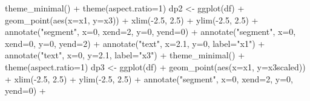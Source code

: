 \documentclass[
  letterpaper,
]{book}
\newenvironment{Shaded}{\begin{snugshade}}{\end{snugshade}}
\newcommand{\AttributeTok}[1]{\textcolor[rgb]{0.40,0.45,0.13}{#1}}
\newcommand{\DecValTok}[1]{\textcolor[rgb]{0.68,0.00,0.00}{#1}}
\newcommand{\FloatTok}[1]{\textcolor[rgb]{0.68,0.00,0.00}{#1}}
\newcommand{\FunctionTok}[1]{\textcolor[rgb]{0.28,0.35,0.67}{#1}}
\newcommand{\NormalTok}[1]{\textcolor[rgb]{0.00,0.23,0.31}{#1}}
\newcommand{\OtherTok}[1]{\textcolor[rgb]{0.00,0.23,0.31}{#1}}
\newcommand{\SpecialCharTok}[1]{\textcolor[rgb]{0.37,0.37,0.37}{#1}}
\newcommand{\StringTok}[1]{\textcolor[rgb]{0.13,0.47,0.30}{#1}}
\begin{document}
\begin{Shaded}
\begin{Highlighting}[]
  \FunctionTok{theme\_minimal}\NormalTok{() }\SpecialCharTok{+}
  \FunctionTok{theme}\NormalTok{(}\AttributeTok{aspect.ratio=}\DecValTok{1}\NormalTok{)}
\NormalTok{dp2 }\OtherTok{\textless{}{-}} \FunctionTok{ggplot}\NormalTok{(df) }\SpecialCharTok{+} 
  \FunctionTok{geom\_point}\NormalTok{(}\FunctionTok{aes}\NormalTok{(}\AttributeTok{x=}\NormalTok{x1, }\AttributeTok{y=}\NormalTok{x3)) }\SpecialCharTok{+}
  \FunctionTok{xlim}\NormalTok{(}\SpecialCharTok{{-}}\FloatTok{2.5}\NormalTok{, }\FloatTok{2.5}\NormalTok{) }\SpecialCharTok{+} \FunctionTok{ylim}\NormalTok{(}\SpecialCharTok{{-}}\FloatTok{2.5}\NormalTok{, }\FloatTok{2.5}\NormalTok{) }\SpecialCharTok{+}
  \FunctionTok{annotate}\NormalTok{(}\StringTok{"segment"}\NormalTok{, }\AttributeTok{x=}\DecValTok{0}\NormalTok{, }\AttributeTok{xend=}\DecValTok{2}\NormalTok{, }\AttributeTok{y=}\DecValTok{0}\NormalTok{, }\AttributeTok{yend=}\DecValTok{0}\NormalTok{) }\SpecialCharTok{+}
  \FunctionTok{annotate}\NormalTok{(}\StringTok{"segment"}\NormalTok{, }\AttributeTok{x=}\DecValTok{0}\NormalTok{, }\AttributeTok{xend=}\DecValTok{0}\NormalTok{, }\AttributeTok{y=}\DecValTok{0}\NormalTok{, }\AttributeTok{yend=}\DecValTok{2}\NormalTok{) }\SpecialCharTok{+}
  \FunctionTok{annotate}\NormalTok{(}\StringTok{"text"}\NormalTok{, }\AttributeTok{x=}\FloatTok{2.1}\NormalTok{, }\AttributeTok{y=}\DecValTok{0}\NormalTok{, }\AttributeTok{label=}\StringTok{"x1"}\NormalTok{) }\SpecialCharTok{+}
  \FunctionTok{annotate}\NormalTok{(}\StringTok{"text"}\NormalTok{, }\AttributeTok{x=}\DecValTok{0}\NormalTok{, }\AttributeTok{y=}\FloatTok{2.1}\NormalTok{, }\AttributeTok{label=}\StringTok{"x3"}\NormalTok{) }\SpecialCharTok{+}
  \FunctionTok{theme\_minimal}\NormalTok{() }\SpecialCharTok{+}
  \FunctionTok{theme}\NormalTok{(}\AttributeTok{aspect.ratio=}\DecValTok{1}\NormalTok{)}
\NormalTok{dp3 }\OtherTok{\textless{}{-}} \FunctionTok{ggplot}\NormalTok{(df) }\SpecialCharTok{+} 
  \FunctionTok{geom\_point}\NormalTok{(}\FunctionTok{aes}\NormalTok{(}\AttributeTok{x=}\NormalTok{x1, }\AttributeTok{y=}\NormalTok{x3scaled)) }\SpecialCharTok{+}
  \FunctionTok{xlim}\NormalTok{(}\SpecialCharTok{{-}}\FloatTok{2.5}\NormalTok{, }\FloatTok{2.5}\NormalTok{) }\SpecialCharTok{+} \FunctionTok{ylim}\NormalTok{(}\SpecialCharTok{{-}}\FloatTok{2.5}\NormalTok{, }\FloatTok{2.5}\NormalTok{) }\SpecialCharTok{+}
  \FunctionTok{annotate}\NormalTok{(}\StringTok{"segment"}\NormalTok{, }\AttributeTok{x=}\DecValTok{0}\NormalTok{, }\AttributeTok{xend=}\DecValTok{2}\NormalTok{, }\AttributeTok{y=}\DecValTok{0}\NormalTok{, }\AttributeTok{yend=}\DecValTok{0}\NormalTok{) }\SpecialCharTok{+}

\end{Highlighting}
\end{Shaded}
\end{document}
